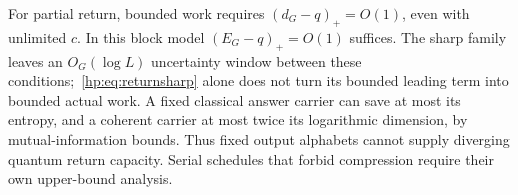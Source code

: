 For partial return, bounded work requires $(d_G-q)_+=O(1)$, even with unlimited $c$. In this block model $(E_G-q)_+=O(1)$ suffices. The sharp family leaves an $O_G(\log L)$ uncertainty window between these conditions;~\eqref{hp:eq:returnsharp} alone does not turn its bounded leading term into bounded actual work. A fixed classical answer carrier can save at most its entropy, and a coherent carrier at most twice its logarithmic dimension, by mutual-information bounds. Thus fixed output alphabets cannot supply diverging quantum return capacity. Serial schedules that forbid compression require their own upper-bound analysis.
